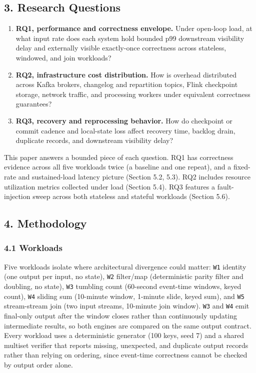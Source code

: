 \documentclass[
]{article}
\providecommand{\tightlist}{%
  \setlength{\itemsep}{0pt}\setlength{\parskip}{0pt}}
\begin{document}
\hypertarget{research-questions}{%
\subsection{3. Research Questions}\label{research-questions}}

\begin{enumerate}
\def\labelenumi{\arabic{enumi}.}
\tightlist
\item
  \textbf{RQ1, performance and correctness envelope.} Under open-loop
  load, at what input rate does each system hold bounded p99 downstream
  visibility delay and externally visible exactly-once correctness
  across stateless, windowed, and join workloads?
\item
  \textbf{RQ2, infrastructure cost distribution.} How is overhead
  distributed across Kafka brokers, changelog and repartition topics,
  Flink checkpoint storage, network traffic, and processing workers
  under equivalent correctness guarantees?
\item
  \textbf{RQ3, recovery and reprocessing behavior.} How do checkpoint or
  commit cadence and local-state loss affect recovery time, backlog
  drain, duplicate records, and downstream visibility delay?
\end{enumerate}

This paper answers a bounded piece of each question. RQ1 has correctness
evidence across all five workloads twice (a baseline and one repeat),
and a fixed-rate and sustained-load latency picture (Section 5.2, 5.3).
RQ2 includes resource utilization metrics collected under load (Section
5.4). RQ3 features a fault-injection sweep across both stateless and
stateful workloads (Section 5.6).

\hypertarget{methodology}{%
\subsection{4. Methodology}\label{methodology}}

\hypertarget{workloads}{%
\subsubsection{4.1 Workloads}\label{workloads}}

Five workloads isolate where architectural divergence could matter:
\texttt{W1} identity (one output per input, no state), \texttt{W2}
filter/map (deterministic parity filter and doubling, no state),
\texttt{W3} tumbling count (60-second event-time windows, keyed count),
\texttt{W4} sliding sum (10-minute window, 1-minute slide, keyed sum),
and \texttt{W5} stream-stream join (two input streams, 10-minute join
window). \texttt{W3} and \texttt{W4} emit final-only output after the
window closes rather than continuously updating intermediate results, so
both engines are compared on the same output contract. Every workload
uses a deterministic generator (100 keys, seed 7) and a shared multiset
verifier that reports missing, unexpected, and duplicate output records
rather than relying on ordering, since event-time correctness cannot be
checked by output order alone.
\end{document}
